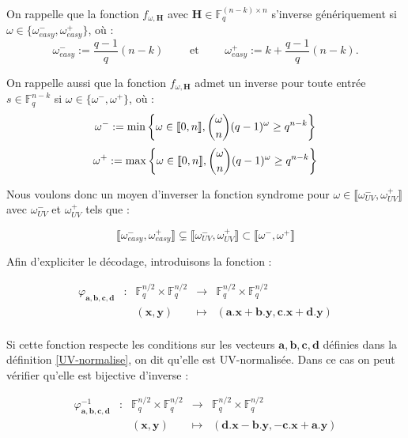 \documentclass[12pt]{article}
\theoremstyle{plain}
\theoremstyle{definition}
\newcommand{\F}{\mathbb{F}}
\begin{document}
\noindent On rappelle que la fonction $f_{\omega,\mathbf{H}}$ avec $\mathbf{H} \in \F_q^{(n-k)\times n}$ s'inverse génériquement si $\omega \in \{\omega_{easy}^-,\omega_{easy}^+\}$, où :
$$ \omega_{easy}^- := \frac{q-1}{q}(n-k) \qquad \text{ et }\qquad  \omega_{easy}^+ := k + \frac{q-1}{q}(n-k).$$




\noindent On rappelle aussi que la fonction $f_{\omega,\mathbf{H}}$ admet un inverse pour toute entrée $s \in \F_q^{n-k}$ si $\omega \in \{\omega^-,\omega^+\}$, où :
$$\omega^- := \min\left\{\omega\in \llbracket0,n\rrbracket , \dbinom{\omega}{n}(q-1)^{\omega} \geq q^{n-k}\right\} $$
$$\omega^+ := \max\left\{\omega\in \llbracket0,n\rrbracket , \dbinom{\omega}{n}(q-1)^{\omega} \geq q^{n-k}\right\}$$


\noindent Nous voulons donc un moyen d'inverser la fonction syndrome pour $\omega \in \llbracket\omega_{UV}^-,\omega_{UV}^+\rrbracket$ avec $\omega_{UV}^-$ et $\omega_{UV}^+$ tels que :

$$\llbracket\omega_{easy}^-,\omega_{easy}^+\rrbracket \subsetneq \llbracket\omega_{UV}^-,\omega_{UV}^+\rrbracket \subset  \llbracket\omega^-,\omega^+\rrbracket$$


\noindent Afin d'expliciter le décodage, introduisons la fonction :

$$\begin{array}{ccccc}
\varphi_{\mathbf{a},\mathbf{b},\mathbf{c},\mathbf{d}} & : & \F_q^{n/2} \times  \F_q^{n/2} & \to & \F_q^{n/2} \times  \F_q^{n/2} \\
 & & (\mathbf{x} , \mathbf{y}) & \mapsto &  (\mathbf{a}.\mathbf{x} + \mathbf{b}.\mathbf{y}, \mathbf{c}.\mathbf{x} + \mathbf{d}.\mathbf{y}) \\
\end{array}$$

\noindent Si cette fonction respecte les conditions sur les vecteurs $\mathbf{a},\mathbf{b},\mathbf{c},\mathbf{d}$ définies dans la définition \ref{UV-normalise}, on dit qu'elle est UV-normalisée. Dans ce cas on peut vérifier qu'elle est bijective d'inverse :

$$\begin{array}{ccccc}
\varphi^{-1}_{\mathbf{a},\mathbf{b},\mathbf{c},\mathbf{d}} & : & \F_q^{n/2} \times  \F_q^{n/2} & \to & \F_q^{n/2} \times  \F_q^{n/2} \\
 & & (\mathbf{x} , \mathbf{y}) & \mapsto &  (\mathbf{d}.\mathbf{x} - \mathbf{b}.\mathbf{y}, -\mathbf{c}.\mathbf{x} + \mathbf{a}.\mathbf{y}) \\
\end{array}$$
\end{document}

